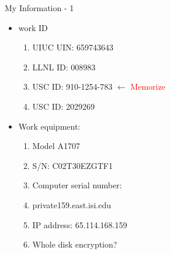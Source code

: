 \begin{frame}{My Information - 1}
\begin{itemize}
  \tiny \item \tiny work ID
  \begin{enumerate}
    \tiny \item \tiny UIUC UIN: 659743643
  \item \tiny LLNL ID: 008983 
  \item \tiny USC ID: 910-1254-783 $\leftarrow$ \textcolor{red}{Memorize} 
  \item \tiny USC ID: 2029269
  \end{enumerate}
\item \tiny Work equipment: 
  \begin{enumerate}
          \tiny \item \tiny Model A1707
          \tiny \item \tiny S/N: C02T30EZGTF1  
          \tiny \item \tiny Computer serial number:
          \tiny \item \tiny private159.east.isi.edu
        \item \tiny IP address:  65.114.168.159
        \item \tiny Whole disk encryption? 
        \end{enumerate}
     
        \seti 
        \end{itemize}
        \end{frame}
